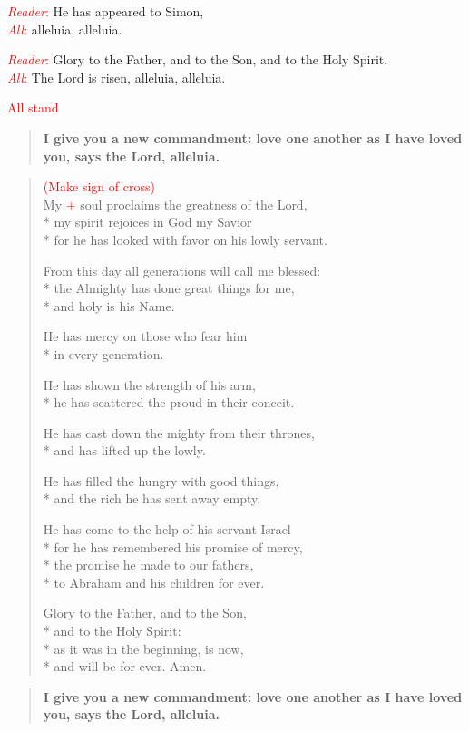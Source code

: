 \documentclass[letterpaper,14pt]{extarticle}
\newcommand{\side}[1]{\flagverse{\textcolor{red}{\textit{#1}}:}}
\newcommand{\sidestar}[1]{\textcolor{red}{\textit{#1}:}}
\newcommand{\rednote}[1]{\textcolor{red}{#1}}
\newlength{\oldindent}
\newcommand{\antiphon}[2]{
	\setlength{\oldindent}{\vindent}
	\setlength{\vindent}{0em}
	\begin{verse}
	\side{#1} \textbf{#2}
	\end{verse}
	\setlength{\vindent}{\oldindent}
}
\begin{document}
\sidestar{Reader} He has appeared to Simon, \\
\sidestar{All} alleluia, alleluia.

\sidestar{Reader} Glory to the Father, and to the Son, and to the Holy Spirit. \\
\sidestar{All} The Lord is risen, alleluia, alleluia.

\rednote{All stand}
\antiphon{Leader}{I give you a new commandment: love one another as I have loved
you, says the Lord, alleluia.}
\setlength{\stanzaskip}{0.25\baselineskip}
\begin{verse}
\rednote{(Make sign of cross)}\\
\side{All} My \rednote{+} soul proclaims the greatness of the Lord, \\*
my spirit rejoices in God my Savior \\*
for he has looked with favor on his lowly servant.

From this day all generations will call me blessed: \\*
the Almighty has done great things for me, \\*
and holy is his Name.

He has mercy on those who fear him \\*
in every generation.

He has shown the strength of his arm, \\*
he has scattered the proud in their conceit.

He has cast down the mighty from their thrones, \\*
and has lifted up the lowly.

He has filled the hungry with good things, \\*
and the rich he has sent away empty.

He has come to the help of his servant Israel \\*
for he has remembered his promise of mercy, \\*
the promise he made to our fathers, \\*
to Abraham and his children for ever.

Glory to the Father, and to the Son, \\*
and to the Holy Spirit: \\*
as it was in the beginning, is now, \\*
and will be for ever. Amen.
\end{verse}
\setlength{\stanzaskip}{0.75\baselineskip}
\antiphon{All}{I give you a new commandment: love one another as I have loved
you, says the Lord, alleluia.}
\end{document}
